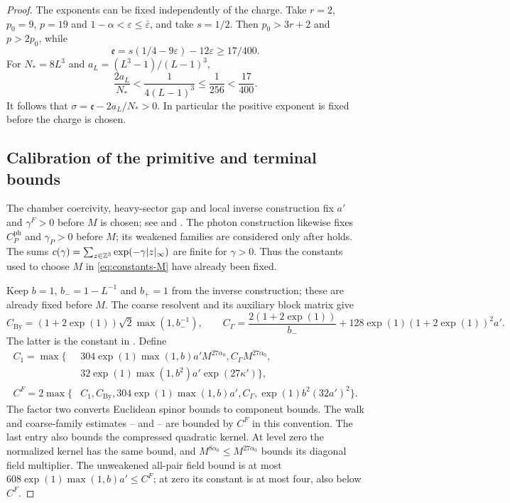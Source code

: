 \begin{proof}
The exponents can be fixed independently of the charge.
Take $r=2$, $p_0=9$, $p=19$ and
$1-\alpha<\varepsilon\le\bar\varepsilon$, and take $s=1/2$.
Then $p_0>3r+2$ and $p>2p_0$, while
\[
 \mathfrak e=s(1/4-9\varepsilon)-12\varepsilon
                      \ge17/400.
\]
For $N_*=8L^3$ and $a_L=(L^3-1)/(L-1)^3$,
\[
 \frac{2a_L}{N_*}
     <\frac1{4(L-1)^3}\le\frac1{256}<\frac{17}{400}.
\]
It follows that $\sigma=\mathfrak e-2a_L/N_*>0$.
In particular the positive exponent is fixed before
the charge is chosen.

\subsection{Calibration of the primitive and terminal bounds}

The chamber coercivity, heavy-sector gap and local inverse
construction fix $a'$ and $\gamma^F>0$ before $M$ is chosen;
see  and
. The photon construction
likewise fixes $C_P^{\mathrm{ph}}$ and $\gamma_P>0$ before $M$;
its weakened families are considered only after
 holds.
The sums $c(\gamma)=\sum_{z\in\mathbb Z^3}
\exp(-\gamma|z|_\infty)$ are finite for $\gamma>0$.
Thus the constants used to choose $M$ in
\eqref{eq:constants-M} have already been fixed.

Keep $b=1$, $b_-=1-L^{-1}$ and $b_+=1$ from the inverse
construction; these are already fixed before $M$.
The coarse resolvent and its auxiliary block matrix give
\[
 C_{\mathrm{By}}=(1+2\exp(1))\sqrt2\max(1,b_-^{-1}),
 \qquad
 C_\Gamma=\frac{2(1+2\exp(1))}{b_-}
                  +128\exp(1)(1+2\exp(1))^2a'.
\]
The latter is the constant in
. Define
\begin{equation}\label{eq:constants-fermion-calibration}
 \begin{split}
 C_1=\max\{&
 304\exp(1)\max(1,b)a'M^{27\alpha_0},
 C_\Gamma M^{27\alpha_0},\\
 &32\exp(1)\max(1,b^2)a'\exp(27\kappa')\},\\
 C^F=2\max\{&
 C_1,C_{\mathrm{By}},304\exp(1)\max(1,b)a',
 C_\Gamma,\exp(1)b^2(32a')^2\}.
 \end{split}
\end{equation}
The factor two converts Euclidean spinor bounds to
component bounds. The walk and coarse-family estimates
--
and --
are bounded by $C^F$ in this convention. The last entry
also bounds the compressed quadratic kernel.
At level zero the normalized kernel has the same bound,
and $M^{8\alpha_0}\le M^{27\alpha_0}$ bounds its diagonal
field multiplier.
The unweakened all-pair field bound
 is at most
$608\exp(1)\max(1,b)a'\le C^F$; at zero its constant is
at most four, also below $C^F$.


\end{proof}
